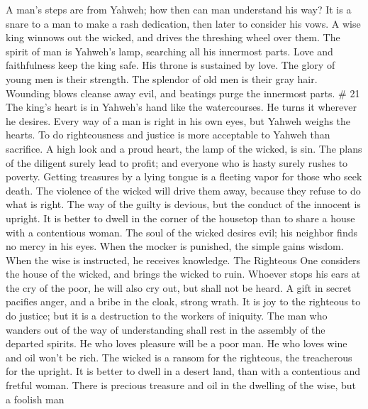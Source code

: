  A man's steps are from Yahweh; how then can man understand
his way?  It is a snare to a man to make a rash dedication,
then later to consider his vows.  A wise king winnows out
the wicked, and drives the threshing wheel over them.  The
spirit of man is Yahweh's lamp, searching all his innermost parts.
 Love and faithfulness keep the king safe. His throne is
sustained by love.  The glory of young men is their
strength. The splendor of old men is their gray hair. 
Wounding blows cleanse away evil, and beatings purge the innermost
parts. \# 21  The king's heart is in Yahweh's hand like the
watercourses. He turns it wherever he desires.  Every way of
a man is right in his own eyes, but Yahweh weighs the hearts.
 To do righteousness and justice is more acceptable to
Yahweh than sacrifice.  A high look and a proud heart, the
lamp of the wicked, is sin.  The plans of the diligent
surely lead to profit; and everyone who is hasty surely rushes to
poverty.  Getting treasures by a lying tongue is a fleeting
vapor for those who seek death.  The violence of the wicked
will drive them away, because they refuse to do what is right.
 The way of the guilty is devious, but the conduct of the
innocent is upright.  It is better to dwell in the corner of
the housetop than to share a house with a contentious woman.
 The soul of the wicked desires evil; his neighbor finds no
mercy in his eyes.  When the mocker is punished, the simple
gains wisdom. When the wise is instructed, he receives knowledge.
 The Righteous One considers the house of the wicked, and
brings the wicked to ruin.  Whoever stops his ears at the
cry of the poor, he will also cry out, but shall not be heard.
 A gift in secret pacifies anger, and a bribe in the cloak,
strong wrath.  It is joy to the righteous to do justice;
but it is a destruction to the workers of iniquity.  The
man who wanders out of the way of understanding shall rest in the
assembly of the departed spirits.  He who loves pleasure
will be a poor man. He who loves wine and oil won't be rich.
 The wicked is a ransom for the righteous, the treacherous
for the upright.  It is better to dwell in a desert land,
than with a contentious and fretful woman.  There is
precious treasure and oil in the dwelling of the wise, but a foolish man
